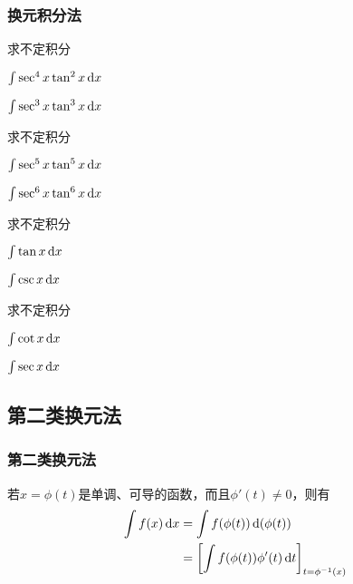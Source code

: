 \documentclass[14pt,notheorems,leqno,xcolor={rgb}]{beamer} %
\begin{document}
\begin{iframe}
\frametitle{换元积分法}
\begin{example}
求不定积分
\begin{enumlite}
\item $\int \sec^4x\tan^2 x \mathop{}\!\mathrm{d}{x}$
\item $\int \sec^3x\tan^3 x \mathop{}\!\mathrm{d}{x}$
\end{enumlite}
\end{example}
\vpause
\begin{exercise}
求不定积分
\begin{enumlite}
\item $\int \sec^5x \tan^5 x \mathop{}\!\mathrm{d}{x}$
\item $\int \sec^6x \tan^6 x \mathop{}\!\mathrm{d}{x}$
\end{enumlite}
\end{exercise}
\end{iframe}

\begin{frame}
\begin{example}
求不定积分
\begin{enumlite}
\item $\int \tan x \mathop{}\!\mathrm{d}{x}$
\item $\int \csc x \mathop{}\!\mathrm{d}{x}$
\end{enumlite}
\end{example}
\vpause
\begin{exercise}
求不定积分
\begin{enumlite}
\item $\int \cot x \mathop{}\!\mathrm{d}{x}$
\item $\int \sec x \mathop{}\!\mathrm{d}{x}$
\end{enumlite}
\end{exercise}
\end{frame}

\subsection{第二类换元法}

\begin{frame}
\frametitle{第二类换元法}
若$x=\phi(t)$是单调、可导的函数，而且$\phi'(t)\neq0$，则有\cbold\large
\begin{align*}
\int f(x)\mathop{}\!\mathrm{d} x &= \int f(\phi(t))\mathop{}\!\mathrm{d}{}(\phi(t)) \\
                          &= \left[\int f(\phi(t))\phi'(t)\mathop{}\!\mathrm{d} t\right]_{t=\phi^{-1}(x)}
\end{align*}
\end{frame}
\end{document}
